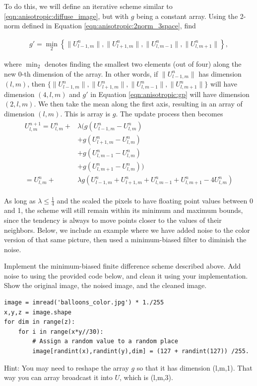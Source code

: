 To do this, we will define an iterative scheme similar to \eqref{eqn:anisotropic:diffuse_image}, but with $g$ being a constant array.
Using the 2-norm defined in Equation \eqref{eqn:anisotropic:2norm_3space}, find

\begin{align}
g' = \min_2\left \{ \|U^n_{l-1,m}\|, \|U^n_{l+1,m}\|, \|U^n_{l,m-1}\|, \|U^n_{l,m+1}\| \right\},
\label{eqn:anisotropic:gp}
\end{align}

where $\min_2$ denotes finding the smallest two elements (out of four) along the new 0-th dimension of the array. In other words, if $ \|U^n_{l-1,m}\|$ has dimension $(l,m)$, then $\{ \|U^n_{l-1,m}\|, \|U^n_{l+1,m}\|, \|U^n_{l,m-1}\|, \|U^n_{l,m+1}\| \}$ will have dimension $(4,l,m)$ and $g'$ in Equation \eqref{eqn:anisotropic:gp} will have dimension $(2,l,m)$. We then take the mean along the first axis, resulting in an array of dimension $(l,m)$. This is array is $g$. The update process then becomes
\begin{align}
\begin{split}
U_{l,m}^{n+1} = U_{l,m}^n + & \lambda (g(U_{l-1,m}^n - U_{l,m}^n) \\
					& + g(U_{l+1,m}^n - U_{l,m}^n) \\
					& + g(U_{l,m-1}^n - U_{l,m}^n) \\
					& + g(U_{l,m+1}^n - U_{l,m}^n))\\
=U_{l,m}^n + &\lambda g(U_{l-1,m}^n + U_{l+1,m}^n  + U_{l,m-1}^n + U_{l,m+1}^n - 4U_{l,m}^n)
\label{eqn:anisotropic:min_bias}
\end{split}
\end{align}

As long as $\lambda \leq \frac{1}{4}$ and the scaled the pixels to have floating point values between 0 and 1, the scheme will still remain within its minimum and maximum bounds, since the tendency is always to move points closer to the values of their neighbors.
Below, we include an example where we have added noise to the color version of that same picture, then used a minimum-biased filter to diminish the noise.

\begin{problem}

Implement the minimum-biased finite difference scheme described above.
Add noise to  using the provided code below, and clean it using your implementation.
Show the original image, the noised image, and the cleaned image. 

\begin{lstlisting}
image = imread('balloons_color.jpg') * 1./255
x,y,z = image.shape
for dim in range(z):
    for i in range(x*y//30):
        # Assign a random value to a random place
        image[randint(x),randint(y),dim] = (127 + randint(127)) /255.
\end{lstlisting}
Hint: You may need to reshape the array $g$ so that it has dimension (l,m,1). That way you can array broadcast it into $U$, which is (l,m,3).

\end{problem}

